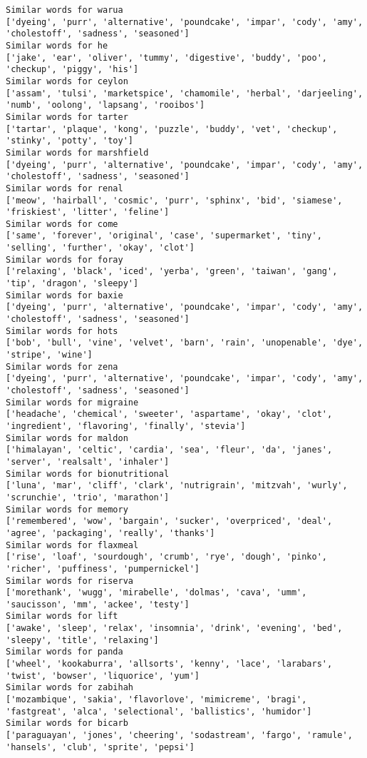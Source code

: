 \documentclass[11pt]{article}
\begin{document}
\begin{Verbatim}[commandchars=\\\{\}]
Similar words for warua
['dyeing', 'purr', 'alternative', 'poundcake', 'impar', 'cody', 'amy', 'cholestoff', 'sadness', 'seasoned']
Similar words for he
['jake', 'ear', 'oliver', 'tummy', 'digestive', 'buddy', 'poo', 'checkup', 'piggy', 'his']
Similar words for ceylon
['assam', 'tulsi', 'marketspice', 'chamomile', 'herbal', 'darjeeling', 'numb', 'oolong', 'lapsang', 'rooibos']
Similar words for tarter
['tartar', 'plaque', 'kong', 'puzzle', 'buddy', 'vet', 'checkup', 'stinky', 'potty', 'toy']
Similar words for marshfield
['dyeing', 'purr', 'alternative', 'poundcake', 'impar', 'cody', 'amy', 'cholestoff', 'sadness', 'seasoned']
Similar words for renal
['meow', 'hairball', 'cosmic', 'purr', 'sphinx', 'bid', 'siamese', 'friskiest', 'litter', 'feline']
Similar words for come
['same', 'forever', 'original', 'case', 'supermarket', 'tiny', 'selling', 'further', 'okay', 'clot']
Similar words for foray
['relaxing', 'black', 'iced', 'yerba', 'green', 'taiwan', 'gang', 'tip', 'dragon', 'sleepy']
Similar words for baxie
['dyeing', 'purr', 'alternative', 'poundcake', 'impar', 'cody', 'amy', 'cholestoff', 'sadness', 'seasoned']
Similar words for hots
['bob', 'bull', 'vine', 'velvet', 'barn', 'rain', 'unopenable', 'dye', 'stripe', 'wine']
Similar words for zena
['dyeing', 'purr', 'alternative', 'poundcake', 'impar', 'cody', 'amy', 'cholestoff', 'sadness', 'seasoned']
Similar words for migraine
['headache', 'chemical', 'sweeter', 'aspartame', 'okay', 'clot', 'ingredient', 'flavoring', 'finally', 'stevia']
Similar words for maldon
['himalayan', 'celtic', 'cardia', 'sea', 'fleur', 'da', 'janes', 'server', 'realsalt', 'inhaler']
Similar words for bionutritional
['luna', 'mar', 'cliff', 'clark', 'nutrigrain', 'mitzvah', 'wurly', 'scrunchie', 'trio', 'marathon']
Similar words for memory
['remembered', 'wow', 'bargain', 'sucker', 'overpriced', 'deal', 'agree', 'packaging', 'really', 'thanks']
Similar words for flaxmeal
['rise', 'loaf', 'sourdough', 'crumb', 'rye', 'dough', 'pinko', 'richer', 'puffiness', 'pumpernickel']
Similar words for riserva
['morethank', 'wugg', 'mirabelle', 'dolmas', 'cava', 'umm', 'saucisson', 'mm', 'ackee', 'testy']
Similar words for lift
['awake', 'sleep', 'relax', 'insomnia', 'drink', 'evening', 'bed', 'sleepy', 'title', 'relaxing']
Similar words for panda
['wheel', 'kookaburra', 'allsorts', 'kenny', 'lace', 'larabars', 'twist', 'bowser', 'liquorice', 'yum']
Similar words for zabihah
['mozambique', 'sakia', 'flavorlove', 'mimicreme', 'bragi', 'fastgreat', 'alca', 'selectional', 'ballistics', 'humidor']
Similar words for bicarb
['paraguayan', 'jones', 'cheering', 'sodastream', 'fargo', 'ramule', 'hansels', 'club', 'sprite', 'pepsi']

\end{Verbatim}
\end{document}
